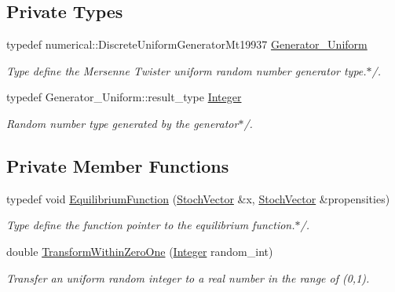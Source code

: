 \subsection*{Private Types}
\begin{CompactItemize}
\item 
\hypertarget{class_s_s_a_4684d2b7d06ade41d3f00fe2720602b6}{
typedef numerical::DiscreteUniformGeneratorMt19937 \hyperlink{class_s_s_a_4684d2b7d06ade41d3f00fe2720602b6}{Generator\_\-Uniform}}
\label{class_s_s_a_4684d2b7d06ade41d3f00fe2720602b6}

\begin{CompactList}\small\item\em Type define the Mersenne Twister uniform random number generator type.$\ast$/. \item\end{CompactList}\item 
\hypertarget{class_s_s_a_5d5e25b033b7cda3afc61f6698c83f5c}{
typedef Generator\_\-Uniform::result\_\-type \hyperlink{class_s_s_a_5d5e25b033b7cda3afc61f6698c83f5c}{Integer}}
\label{class_s_s_a_5d5e25b033b7cda3afc61f6698c83f5c}

\begin{CompactList}\small\item\em Random number type generated by the generator$\ast$/. \item\end{CompactList}\end{CompactItemize}
\subsection*{Private Member Functions}
\begin{CompactItemize}
\item 
\hypertarget{class_s_s_a_184289d7934936bfb24498283a9306da}{
typedef void \hyperlink{class_s_s_a_184289d7934936bfb24498283a9306da}{EquilibriumFunction} (\hyperlink{class_stoch_vector}{StochVector} \&x, \hyperlink{class_stoch_vector}{StochVector} \&propensities)}
\label{class_s_s_a_184289d7934936bfb24498283a9306da}

\begin{CompactList}\small\item\em Type define the function pointer to the equilibrium function.$\ast$/. \item\end{CompactList}\item 
double \hyperlink{class_s_s_a_c29b87a5248207915e35a00689a3b940}{TransformWithinZeroOne} (\hyperlink{class_s_s_a_5d5e25b033b7cda3afc61f6698c83f5c}{Integer} random\_\-int)
\begin{CompactList}\small\item\em Transfer an uniform random integer to a real number in the range of (0,1). \item\end{CompactList}\end{CompactItemize}
